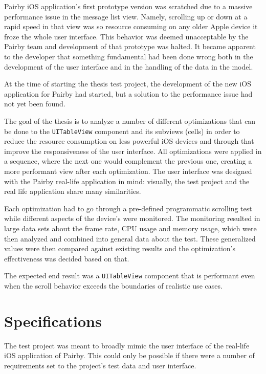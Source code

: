 \documentclass[a4paper,12pt]{article}
\begin{document}
Pairby iOS application's first prototype version was scratched due to a massive performance issue in the message list view. Namely, scrolling up or down at a rapid speed in that view was so resource consuming on any older Apple device it froze the whole user interface. This behavior was deemed unacceptable by the Pairby team and development of that prototype was halted. It became apparent to the developer that something fundamental had been done wrong both in the development of the user interface and in the handling of the data in the model.

At the time of starting the thesis test project, the development of the new iOS application for Pairby had started, but a solution to the performance issue had not yet been found.

The goal of the thesis is to analyze a number of different optimizations that can be done to the \texttt{UITableView} component and its subviews (cells) in order to reduce the resource consumption on less powerful iOS devices and through that improve the responsiveness of the user interface. All optimizations were applied in a sequence, where the next one would complement the previous one, creating a more performant view after each optimization. The user interface was designed with the Pairby real-life application in mind: visually, the test project and the real life application share many similarities.

Each optimization had to go through a pre-defined programmatic scrolling test while different aspects of the device's were monitored. The monitoring resulted in large data sets about the frame rate, CPU usage and memory usage, which were then analyzed and combined into general data about the test. These generalized values were then compared against existing results and the optimization's effectiveness was decided based on that.

The expected end result was a \texttt{UITableView} component that is performant even when the scroll behavior exceeds the boundaries of realistic use cases.

\newpage
\section{Specifications}
The test project was meant to broadly mimic the user interface of the real-life iOS application of Pairby. This could only be possible if there were a number of requirements set to the project's test data and user interface.
\end{document}
